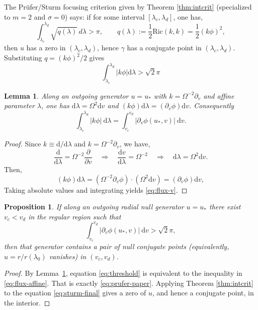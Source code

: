 \documentclass[a4paper, reqno]{amsart}
\numberwithin{equation}{section}
\theoremstyle{plain}
\newtheorem{proposition}[theorem]{Proposition}
\newtheorem{lemma}[theorem]{Lemma}
\theoremstyle{definition}
\theoremstyle{remark}
\newcommand{\dd}{\mathrm{d}}
\begin{document}
The Pr\"ufer/Sturm focusing criterion given by Theorem \ref{thm:intcrit} (specialized to $m=2$ and $\sigma=0$) says: if for some interval $[\lambda_c,\lambda_d]$, one has,
\begin{equation}\label{eq:prufer-paper}
\int_{\lambda_c}^{\lambda_d}\sqrt{q(\lambda)}\,d\lambda > \pi,
\qquad
q(\lambda):=\frac12\mathrm{Ric}(k,k)= \frac{1}{2} (k\phi)^2,
\end{equation}
then $u$ has a zero in $(\lambda_c,\lambda_d)$, hence $\gamma$ has a conjugate point in $(\lambda_c,\lambda_d)$. Substituting $q=(k\phi)^2/2$ gives
\begin{equation}\label{eq:flux-affine}
\int_{\lambda_c}^{\lambda_d} |k\phi|\dd\lambda > \sqrt{2}\pi
\end{equation}

\begin{lemma}\label{lem:flux-v}
Along an outgoing generator $u=u_*$ with $k=\Omega^{-2}\partial_v$ and affine parameter $\lambda$, one has $\dd\lambda=\Omega^2 \dd v$ and $(k\phi)\dd\lambda = (\partial_v\phi)\dd v$. Consequently
\begin{equation}\label{eq:flux-v}
\int_{\lambda_c}^{\lambda_d}|k\phi|\ \dd\lambda= \int_{v_c}^{v_d}|\partial_v\phi(u_*,v)|\ \dd v.
\end{equation}
\end{lemma}

\begin{proof}
Since $k\equiv \dd/\dd\lambda$ and $k=\Omega^{-2}\partial_v$, we have,
$$
\frac{\dd}{\dd\lambda} = \Omega^{-2}\frac{\partial}{\partial v}
\quad\Longrightarrow\quad
\frac{\dd v}{\dd\lambda}=\Omega^{-2}
\quad\Longrightarrow\quad
\dd\lambda=\Omega^2 \dd v.
$$
Then,
$$
(k\phi) \dd\lambda = (\Omega^{-2}\partial_v\phi)\cdot(\Omega^2\dd v)=(\partial_v\phi)\dd v,
$$
Taking absolute values and integrating yields \eqref{eq:flux-v}.
\end{proof}

\begin{proposition}\label{prop:explicit-threshold}
If along an outgoing radial null generator $u=u_*$ there exist $v_c<v_d$ in the regular region such that
\begin{equation}\label{eq:threshold}
\int_{v_c}^{v_d} |\partial_v\phi(u_*,v)|\ \dd v > \sqrt{2} \pi,
\end{equation}
then that generator contains a pair of null conjugate points (equivalently, $u=r/r(\lambda_0)$ vanishes) in $(v_c,v_d)$.
\end{proposition}
\begin{proof}
By Lemma~\ref{lem:flux-v}, equation \eqref{eq:threshold} is equivalent to the inequality in \eqref{eq:flux-affine}. That is exactly \eqref{eq:prufer-paper}. Applying Theorem \ref{thm:intcrit} to the equation \eqref{eq:sturm-final} gives a zero of $u$, and hence a conjugate point, in the interior.

\end{proof}
\end{document}
